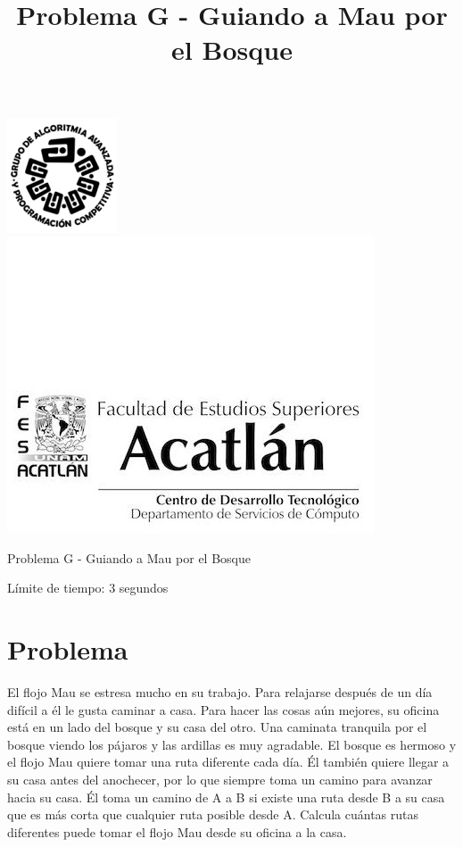 \documentclass[letter,10pt]{article}
\date{}
\begin{document}
\title{Problema G - Guiando a Mau por el Bosque}

\includegraphics[scale=0.6]{logo} \hspace*{9.00cm}
\includegraphics[scale=0.5]{dsc} 
\bigskip
\begin{center}
	\Large Problema G - Guiando a Mau por el Bosque
\end{center}

\begin{flushright}
Límite de tiempo: 3 segundos
\par\end{flushright}
\bigskip

\section*{Problema}

El flojo Mau se estresa mucho en su trabajo. Para relajarse después de un día difícil a él le gusta caminar a casa. Para hacer las cosas aún mejores, su oficina está en un lado del bosque y su casa del otro. Una caminata tranquila por el bosque viendo los pájaros y las ardillas es muy agradable. El bosque es hermoso y el flojo Mau quiere tomar una ruta diferente cada día. Él también quiere llegar a su casa antes del anochecer, por lo que siempre toma un camino para avanzar hacia su casa. Él toma un camino de A a B si existe una ruta desde B a su casa que es más corta que cualquier ruta posible desde A. Calcula cuántas rutas diferentes puede tomar el flojo Mau desde su oficina a la casa.
\end{document}
